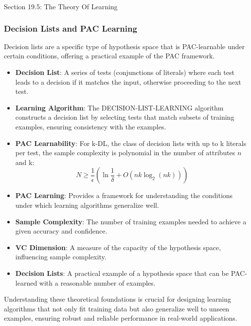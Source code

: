 \begin{notes}{Section 19.5: The Theory Of Learning}
\begin{highlight}
    \end{highlight}
    
    \subsubsection*{Decision Lists and PAC Learning}
    
    Decision lists are a specific type of hypothesis space that is PAC-learnable under certain conditions, offering a practical example of the PAC framework.
    
    \begin{highlight}
    
        \begin{itemize}
            \item \textbf{Decision List}: A series of tests (conjunctions of literals) where each test leads to a decision if it matches the input, otherwise proceeding to the next test.
            \item \textbf{Learning Algorithm}: The DECISION-LIST-LEARNING algorithm constructs a decision list by selecting tests that match subsets of training examples, ensuring consistency with the examples.
            \item \textbf{PAC Learnability}: For k-DL, the class of decision lists with up to k literals per test, the sample complexity is polynomial in the number of attributes $n$ and k:
            \[
            N \geq \frac{1}{\epsilon} \left(\ln \frac{1}{\delta} + O(nk \log_2(nk))\right)
            \]
        \end{itemize}
    
    \end{highlight}
    
    \begin{highlight}
    
        \begin{itemize}
            \item \textbf{PAC Learning}: Provides a framework for understanding the conditions under which learning algorithms generalize well.
            \item \textbf{Sample Complexity}: The number of training examples needed to achieve a given accuracy and confidence.
            \item \textbf{VC Dimension}: A measure of the capacity of the hypothesis space, influencing sample complexity.
            \item \textbf{Decision Lists}: A practical example of a hypothesis space that can be PAC-learned with a reasonable number of examples.
        \end{itemize}
    
        Understanding these theoretical foundations is crucial for designing learning algorithms that not only fit training data but also generalize well to unseen examples, ensuring robust and reliable performance in real-world applications.
    
    \end{highlight}
\end{notes}

